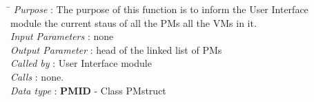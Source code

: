 \documentclass[a4paper,11pt]{article}
\begin{document}
\begin{itemize}
\begin{tabbing}
\hspace*{3.2cm}\= \kill
 \textit{Purpose} \> : The purpose of this function is to inform the User Interface\\ \> module the current staus of all the PMs all the VMs in it.\\
  \textit{Input Parameters} \> : none \\
  \textit{Output Parameter} \> : head of the linked list of PMs \\
    \textit{Called by} \> : User Interface module \\
  \textit{Calls} \> : none.\\
  \textit{Data type} \> : \textbf{PM\textunderscore ID} - Class PMstruct
\end{tabbing}
\end{itemize}
\end{document}
